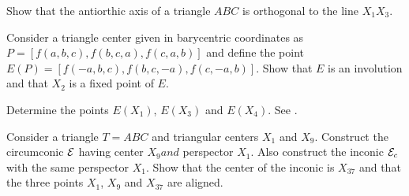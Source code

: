 \begin{exercise} Show that the
 antiorthic axis of a triangle $ABC$ is orthogonal to the line $X_1X_3$.
\end{exercise}

\begin{exercise} Consider a triangle center given in  barycentric coordinates as $P=[f(a,b,c),f(b,c,a), f(c,a,b)]$ and define the point $E(P)=[f(-a,b,c),f(b,c,-a), f(c, -a,b)]$. 
Show that $E $ is an involution   and   that $X_2$ is a fixed point of $E$. 

Determine the points $E(X_1)$, $E(X_3)$ and $E(X_4)$. See \cite{etc}.
 
 
\end{exercise}

\begin{exercise}
Consider a triangle $T=ABC$ and triangular centers $X_1$ and $X_9$.
Construct the circumconic $\mathcal{E}$ having center $X_9 and $    perspector   $X_1$. Also construct the inconic $\mathcal{E}_c$ with the same perspector $X_1$. Show that the center of the inconic is $X_{37}$ and that the three points $X_1$, $X_9$ and $X_{37}$ are aligned. 
\end{exercise}